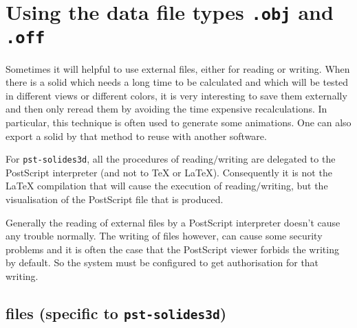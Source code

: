 \section{Using the data file types \texttt{.obj} and \texttt{.off}}

Sometimes it will helpful to use external files, either for reading or writing.
When there is a solid which needs a long time to be calculated and which
will be tested in different views or different colors, it is very
interesting to save them externally and then only reread them by
avoiding the time expensive recalculations. In particular, this technique
is often used to generate some animations.
One can also export a solid by that method to reuse with another software.

For \texttt{pst-solides3d}, all the procedures of reading$/$writing are
delegated to the  PostScript interpreter (and not to \TeX {} or \LaTeX).
 Consequently it is not the \LaTeX{} compilation that will cause the
 execution of reading$/$writing, but the visualisation of the PostScript
 file that is produced.

Generally the reading of external files by a PostScript interpreter doesn't
cause any trouble normally. The writing of files however, can cause some
security problems and it is often the case that the PostScript viewer forbids
the writing by default. So the system must be configured  to get authorisation for that writing.



\subsection{\texttt{} files (specific to \texttt{pst-solides3d})}

